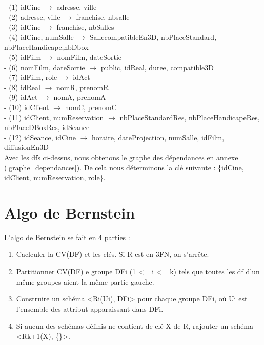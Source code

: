 \documentclass[a4paper,sffamily,12pt]{article}
\begin{document}
		\vspace{0.5cm}
	
		\noindent- (1) idCine $\rightarrow$ adresse, ville \\
		- (2) adresse, ville $\rightarrow$ franchise, nbsalle \\
		- (3) idCine $\rightarrow$ franchise, nbSalles \\
		- (4) idCine, numSalle $\rightarrow$ SallecompatibleEn3D, nbPlaceStandard, nbPlaceHandicape,nbDbox \\
 		- (5) idFilm $\rightarrow$ nomFilm, dateSortie \\
		- (6) nomFilm, dateSortie $\rightarrow$ public, idReal, duree, compatible3D \\
		- (7) idFilm, role $\rightarrow$  idAct \\
		- (8) idReal $\rightarrow$ nomR, prenomR \\
		- (9) idAct $\rightarrow$ nomA, prenomA \\
		- (10) idClient $\rightarrow$ nomC, prenomC \\
		- (11) idClient, numReservation $\rightarrow$ nbPlaceStandardRes, nbPlaceHandicapeRes, nbPlaceDBoxRes, idSeance \\
		- (12) idSeance, idCine $\rightarrow$ horaire, dateProjection, numSalle, idFilm, diffusionEn3D \\
		
		Avec les dfs ci-dessus, nous obtenons le graphe des dépendances en annexe (\ref{graphe_dependances}). De cela nous déterminons la clé suivante : \{idCine, idClient, numReservation, role\}.
		
	\section{Algo de Bernstein}
	
		\vspace{0.5cm}

		\noindent L'algo de Bernstein se fait en 4 parties :
	
			\begin{enumerate}[label=\ding{228}]
				\item Caclculer la CV(DF) et les clés. Si R est en 3FN, on s'arrête. 
				\item Partitionner CV(DF) e groupe DFi (1 <= i <= k) tels que toutes les df d'un même groupes aient la même partie gauche. 
				\item Construire un schéma <Ri(Ui), DFi> pour chaque groupe DFi, où Ui est l'ensemble des attribut apparaissant dans DFi.
				\item Si aucun des schémas définis ne contient de clé X de R, rajouter un schéma <Rk+1(X), \{\}>.
			\end{enumerate}	
			
\end{document}
